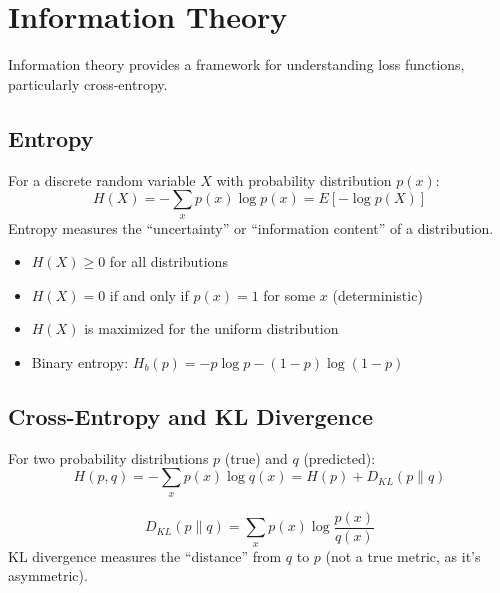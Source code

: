 \section{Information Theory}

Information theory provides a framework for understanding loss functions, particularly cross-entropy.

\subsection{Entropy}

\begin{definition}
For a discrete random variable $X$ with probability distribution $p(x)$:
\begin{equation}
H(X) = -\sum_{x} p(x) \log p(x) = E[-\log p(X)]
\end{equation}
Entropy measures the ``uncertainty'' or ``information content'' of a distribution.
\end{definition}

\begin{property}
\begin{itemize}
    \item $H(X) \geq 0$ for all distributions
    \item $H(X) = 0$ if and only if $p(x) = 1$ for some $x$ (deterministic)
    \item $H(X)$ is maximized for the uniform distribution
    \item Binary entropy: $H_b(p) = -p\log p - (1-p)\log(1-p)$
\end{itemize}
\end{property}

\subsection{Cross-Entropy and KL Divergence}

\begin{definition}
For two probability distributions $p$ (true) and $q$ (predicted):
\begin{equation}
H(p, q) = -\sum_{x} p(x) \log q(x) = H(p) + D_{KL}(p \| q)
\end{equation}
\end{definition}

\begin{definition}[KL Divergence]
\begin{equation}
D_{KL}(p \| q) = \sum_{x} p(x) \log \frac{p(x)}{q(x)}
\end{equation}
KL divergence measures the ``distance'' from $q$ to $p$ (not a true metric, as it's asymmetric).
\end{definition}

